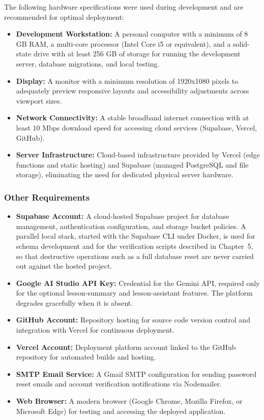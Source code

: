 \documentclass[12pt, oneside]{article} %
\begin{document}
The following hardware specifications were used during development and are recommended for optimal deployment:

\begin{itemize}
    \item \textbf{Development Workstation:} A personal computer with a minimum of 8 GB RAM, a multi-core processor (Intel Core i5 or equivalent), and a solid-state drive with at least 256 GB of storage for running the development server, database migrations, and local testing.
    \item \textbf{Display:} A monitor with a minimum resolution of 1920x1080 pixels to adequately preview responsive layouts and accessibility adjustments across viewport sizes.
    \item \textbf{Network Connectivity:} A stable broadband internet connection with at least 10 Mbps download speed for accessing cloud services (Supabase, Vercel, GitHub).
    \item \textbf{Server Infrastructure:} Cloud-based infrastructure provided by Vercel (edge functions and static hosting) and Supabase (managed PostgreSQL and file storage), eliminating the need for dedicated physical server hardware.
\end{itemize}

\subsubsection{Other Requirements}

\begin{itemize}
    \item \textbf{Supabase Account:} A cloud-hosted Supabase project for database management, authentication configuration, and storage bucket policies. A parallel local stack, started with the Supabase CLI under Docker, is used for schema development and for the verification scripts described in Chapter~5, so that destructive operations such as a full database reset are never carried out against the hosted project.
    \item \textbf{Google AI Studio API Key:} Credential for the Gemini API, required only for the optional lesson-summary and lesson-assistant features. The platform degrades gracefully when it is absent.
    \item \textbf{GitHub Account:} Repository hosting for source code version control and integration with Vercel for continuous deployment.
    \item \textbf{Vercel Account:} Deployment platform account linked to the GitHub repository for automated builds and hosting.
    \item \textbf{SMTP Email Service:} A Gmail SMTP configuration for sending password reset emails and account verification notifications via Nodemailer.
    \item \textbf{Web Browser:} A modern browser (Google Chrome, Mozilla Firefox, or Microsoft Edge) for testing and accessing the deployed application.
\end{itemize}
\end{document}
